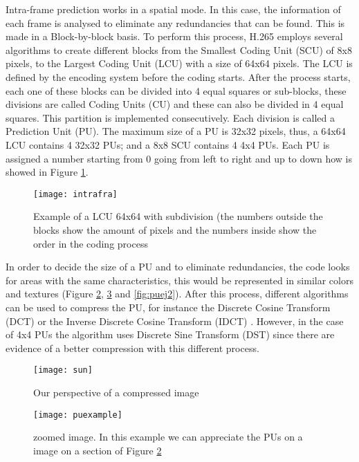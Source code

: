\documentclass[10pt,journal,compsoc]{IEEEtran}
\begin{document}
Intra-frame prediction works in a spatial mode. In this case, the information of each frame is analysed to eliminate any redundancies that can be found. This is made in a Block-by-block basis. To perform this process, H.265 employs several algorithms to create different blocks from the Smallest Coding Unit (SCU) of 8x8 pixels, to the Largest Coding Unit (LCU) with a size of 64x64 pixels.\cite{fasthevc} The LCU is defined by the encoding system before the coding starts. After the process starts, each one of these blocks can be divided into 4 equal squares or sub-blocks, these divisions are called Coding Units (CU) and these can also be divided in 4 equal squares. This partition is implemented consecutively. Each division is called a Prediction Unit (PU). The maximum size of a PU is 32x32 pixels, thus, a 64x64 LCU contains 4 32x32 PUs; and a 8x8 SCU contains 4 4x4 PUs. Each PU is assigned a number starting from 0 going from left to right and up to down \cite{simple} how is showed in Figure \ref{fig:LCU}. 


\begin{figure}[h]
\texttt{[image: intrafra]}
\caption{Example of a LCU 64x64 with subdivision (the numbers outside the blocks show the amount of pixels and the numbers inside show the order in the coding process}
\label{fig:LCU}
\end{figure}


In order to decide the size of a PU and to eliminate redundancies, the code looks for areas with the same characteristics, this would be represented in similar colors and textures (Figure \ref{fig:sun}, \ref{fig:puej1} and \ref{fig:puej2}). After this process, different algorithms can be used to compress the PU, for instance the Discrete Cosine Transform (DCT) or the Inverse  Discrete  Cosine  Transform (IDCT) \cite{cosine}. However, in the case of 4x4 PUs the algorithm uses Discrete Sine Transform (DST) since there are evidence of a better compression with this different process. \cite{tech}

\begin{figure}[h!]
\texttt{[image: sun]}
\caption{Our perspective of a compressed image \cite{sunset}} 
\label{fig:sun}
\end{figure}

\begin{figure}[h!]
\texttt{[image: puexample]}
\caption{zoomed image. In this example we can appreciate the PUs on a image on a section of Figure \ref{fig:sun}}
\label{fig:puej1}
\end{figure}
\end{document}
